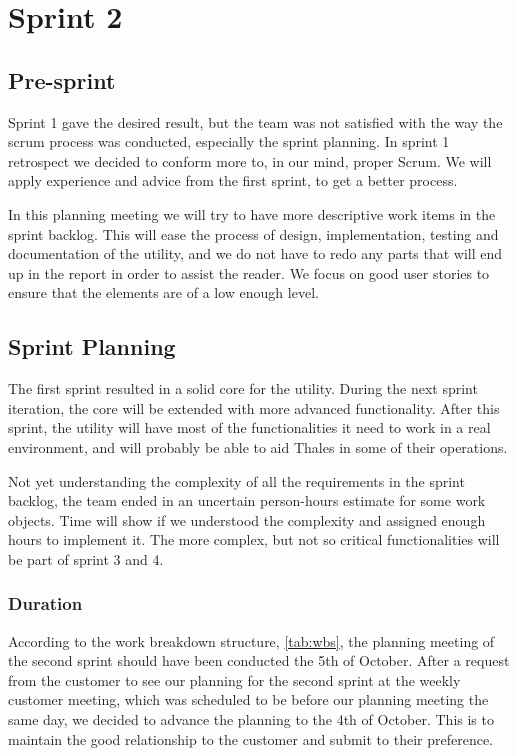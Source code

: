 \chapter{Sprint 2}

\section{Pre-sprint}
Sprint 1 gave the desired result, but the team was not satisfied with the way the \Gls{scrum} process was conducted, especially the sprint planning. In sprint 1 retrospect we decided to conform more to, in our mind, proper Scrum. We will apply experience and advice from the first sprint, to get a better process. 

In this planning meeting we will try to have more descriptive work items in the sprint backlog. This will ease the process of design, implementation, testing and documentation of the \gls{utility}, and we do not have to redo any parts that will end up in the report in order to assist the reader. We focus on good user stories to ensure that the elements are of a low enough level.


\section{Sprint Planning}
The first sprint resulted in a solid core for the \gls{utility}. During the next sprint iteration, the core will be extended with more advanced functionality. After this sprint, the \gls{utility} will have most of the functionalities it need to work in a real environment, and will probably be able to aid Thales in some of their operations.

Not yet understanding the complexity of all the requirements in the sprint backlog, the team ended in an uncertain person-hours estimate for some work objects. Time will show if we understood the complexity and assigned enough hours to implement it. The more complex, but not so critical functionalities will be part of sprint 3 and 4.   

\subsection{Duration}
According to the work breakdown structure, \autoref{tab:wbs}, the planning meeting of the second sprint should have been conducted the 5th of October. After a request from the customer to see our planning for the second sprint at the weekly customer meeting, which was scheduled to be before our planning meeting the same day, we decided to advance the planning to the 4th of October. This is to maintain the good relationship to the customer and submit to their preference.


